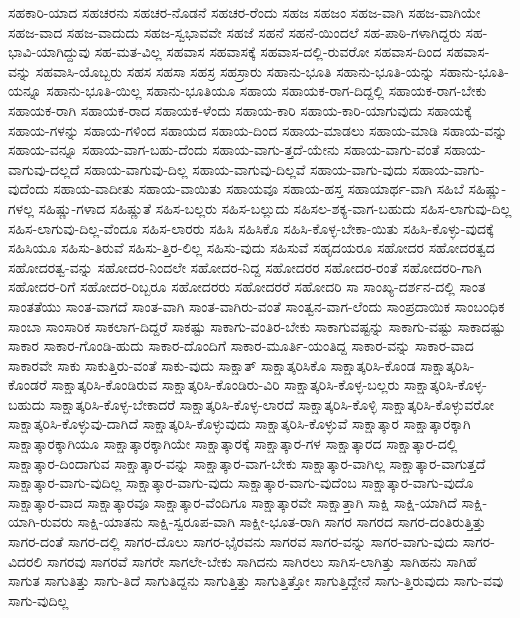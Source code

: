 {ಸಹಕಾರಿ-ಯಾದ
ಸಹಚರನು
ಸಹಚರ-ನೊಡನೆ
ಸಹಚರ-ರೆಂದು
ಸಹಜ
ಸಹಜಂ
ಸಹಜ-ವಾಗಿ
ಸಹಜ-ವಾಗಿಯೇ
ಸಹಜ-ವಾದ
ಸಹಜ-ವಾದುದು
ಸಹಜ-ಸ್ವಭಾವವೇ
ಸಹಜೆ
ಸಹನೆ
ಸಹನೆ-ಯಿಂದಲೆ
ಸಹ-ಪಾಠಿ-ಗಳಾಗಿದ್ದರು
ಸಹ-ಭಾವಿ-ಯಾಗಿದ್ದುವು
ಸಹ-ಮತ-ವಿಲ್ಲ
ಸಹವಾಸ
ಸಹವಾಸಕ್ಕೆ
ಸಹವಾಸ-ದಲ್ಲಿ-ರುವರೋ
ಸಹವಾಸ-ದಿಂದ
ಸಹವಾಸ-ವನ್ನು
ಸಹವಾಸಿ-ಯೊಬ್ಬರು
ಸಹಸ
ಸಹಸಾ
ಸಹಸ್ರ
ಸಹಸ್ರಾರು
ಸಹಾನು-ಭೂತಿ
ಸಹಾನು-ಭೂತಿ-ಯನ್ನು
ಸಹಾನು-ಭೂತಿ-ಯನ್ನೂ
ಸಹಾನು-ಭೂತಿ-ಯಿಲ್ಲ
ಸಹಾನು-ಭೂತಿಯೂ
ಸಹಾಯ
ಸಹಾಯಕ-ರಾಗ-ದಿದ್ದಲ್ಲಿ
ಸಹಾಯಕ-ರಾಗ-ಬೇಕು
ಸಹಾಯಕ-ರಾಗಿ
ಸಹಾಯಕ-ರಾದ
ಸಹಾಯಕ-ಳೆಂದು
ಸಹಾಯ-ಕಾರಿ
ಸಹಾಯ-ಕಾರಿ-ಯಾಗುವುದು
ಸಹಾಯಕ್ಕೆ
ಸಹಾಯ-ಗಳನ್ನು
ಸಹಾಯ-ಗಳಿಂದ
ಸಹಾಯದ
ಸಹಾಯ-ದಿಂದ
ಸಹಾಯ-ಮಾಡಲು
ಸಹಾಯ-ಮಾಡಿ
ಸಹಾಯ-ವನ್ನು
ಸಹಾಯ-ವನ್ನೂ
ಸಹಾಯ-ವಾಗ-ಬಹು-ದೆಂದು
ಸಹಾಯ-ವಾಗು-ತ್ತದೆ-ಯೇನು
ಸಹಾಯ-ವಾಗು-ವಂತೆ
ಸಹಾಯ-ವಾಗುವು-ದಲ್ಲದೆ
ಸಹಾಯ-ವಾಗುವು-ದಿಲ್ಲ
ಸಹಾಯ-ವಾಗುವು-ದಿಲ್ಲವೆ
ಸಹಾಯ-ವಾಗು-ವುದು
ಸಹಾಯ-ವಾಗು-ವುದೆಂದು
ಸಹಾಯ-ವಾದೀತು
ಸಹಾಯ-ವಾಯಿತು
ಸಹಾಯವೂ
ಸಹಾಯ-ಹಸ್ತ
ಸಹಾಯಾರ್ಥ-ವಾಗಿ
ಸಹಿಬೆ
ಸಹಿಷ್ಣು-ಗಳಲ್ಲ
ಸಹಿಷ್ಣು-ಗಳಾದ
ಸಹಿಷ್ಣುತೆ
ಸಹಿಸ-ಬಲ್ಲರು
ಸಹಿಸ-ಬಲ್ಲುದು
ಸಹಿಸಲ-ಶಕ್ಯ-ವಾಗ-ಬಹುದು
ಸಹಿಸ-ಲಾಗುವು-ದಿಲ್ಲ
ಸಹಿಸ-ಲಾಗುವು-ದಿಲ್ಲ-ವೆಂದೂ
ಸಹಿಸ-ಲಾರರು
ಸಹಿಸಿ
ಸಹಿಸಿಕೊ
ಸಹಿಸಿ-ಕೊಳ್ಳ-ಬೇಕಾ-ಯಿತು
ಸಹಿಸಿ-ಕೊಳ್ಳು-ವುದಕ್ಕೆ
ಸಹಿಸಿಯೂ
ಸಹಿಸು-ತಿರುವೆ
ಸಹಿಸು-ತ್ತಿರ-ಲಿಲ್ಲ
ಸಹಿಸು-ವುದು
ಸಹಿಸುವೆ
ಸಹೃದಯರೂ
ಸಹೋದರ
ಸಹೋದರತ್ವದ
ಸಹೋದರತ್ವ-ವನ್ನು
ಸಹೋದರ-ನಿಂದಲೇ
ಸಹೋದರ-ನಿದ್ದ
ಸಹೋದರರ
ಸಹೋದರ-ರಂತೆ
ಸಹೋದರರಿ-ಗಾಗಿ
ಸಹೋದರ-ರಿಗೆ
ಸಹೋದರ-ರಿಬ್ಬರೂ
ಸಹೋದರರು
ಸಹೋದರರೆ
ಸಹೋದರಿ
ಸಾ
ಸಾಂಖ್ಯ-ದರ್ಶನ-ದಲ್ಲಿ
ಸಾಂತ
ಸಾಂತತೆಯು
ಸಾಂತ-ವಾಗದೆ
ಸಾಂತ-ವಾಗಿ
ಸಾಂತ-ವಾಗಿರು-ವಂತೆ
ಸಾಂತ್ವನ-ವಾಗ-ಲೆಂದು
ಸಾಂಪ್ರದಾಯಿಕ
ಸಾಂಬಂಧಿಕ
ಸಾಂಬಾ
ಸಾಂಸಾರಿಕ
ಸಾಕಲಾಗ-ದಿದ್ದರೆ
ಸಾಕಷ್ಟು
ಸಾಕಾಗು-ವಂತಿರ-ಬೇಕು
ಸಾಕಾಗುವಷ್ಟನ್ನು
ಸಾಕಾಗು-ವಷ್ಟು
ಸಾಕಾದಷ್ಟು
ಸಾಕಾರ
ಸಾಕಾರ-ಗೊಂಡಿ-ಹುದು
ಸಾಕಾರ-ದೊಂದಿಗೆ
ಸಾಕಾರ-ಮೂರ್ತಿ-ಯಂತಿದ್ದ
ಸಾಕಾರ-ವನ್ನು
ಸಾಕಾರ-ವಾದ
ಸಾಕಾರವೇ
ಸಾಕು
ಸಾಕುತ್ತಿರು-ವಂತೆ
ಸಾಕು-ವುದು
ಸಾಕ್ಷಾತ್
ಸಾಕ್ಷಾತ್ಕರಿಸಿಕೊ
ಸಾಕ್ಷಾತ್ಕರಿಸಿ-ಕೊಂಡ
ಸಾಕ್ಷಾತ್ಕರಿಸಿ-ಕೊಂಡರೆ
ಸಾಕ್ಷಾತ್ಕರಿಸಿ-ಕೊಂಡಿರುವ
ಸಾಕ್ಷಾತ್ಕರಿಸಿ-ಕೊಂಡಿರು-ವಿರಿ
ಸಾಕ್ಷಾತ್ಕರಿಸಿ-ಕೊಳ್ಳ-ಬಲ್ಲರು
ಸಾಕ್ಷಾತ್ಕರಿಸಿ-ಕೊಳ್ಳ-ಬಹುದು
ಸಾಕ್ಷಾತ್ಕರಿಸಿ-ಕೊಳ್ಳ-ಬೇಕಾದರೆ
ಸಾಕ್ಷಾತ್ಕರಿಸಿ-ಕೊಳ್ಳ-ಲಾರದೆ
ಸಾಕ್ಷಾತ್ಕರಿಸಿ-ಕೊಳ್ಳಿ
ಸಾಕ್ಷಾತ್ಕರಿಸಿ-ಕೊಳ್ಳುವರೋ
ಸಾಕ್ಷಾತ್ಕರಿಸಿ-ಕೊಳ್ಳುವು-ದಾಗಿದೆ
ಸಾಕ್ಷಾತ್ಕರಿಸಿ-ಕೊಳ್ಳುವುದು
ಸಾಕ್ಷಾತ್ಕರಿಸಿ-ಕೊಳ್ಳುವೆ
ಸಾಕ್ಷಾತ್ಕಾರ
ಸಾಕ್ಷಾತ್ಕಾರಕ್ಕಾಗಿ
ಸಾಕ್ಷಾತ್ಕಾರಕ್ಕಾಗಿಯೂ
ಸಾಕ್ಷಾತ್ಕಾರಕ್ಕಾಗಿಯೇ
ಸಾಕ್ಷಾತ್ಕಾರಕ್ಕೆ
ಸಾಕ್ಷಾತ್ಕಾರ-ಗಳ
ಸಾಕ್ಷಾತ್ಕಾರದ
ಸಾಕ್ಷಾತ್ಕಾರ-ದಲ್ಲಿ
ಸಾಕ್ಷಾತ್ಕಾರ-ದಿಂದಾಗುವ
ಸಾಕ್ಷಾತ್ಕಾರ-ವನ್ನು
ಸಾಕ್ಷಾತ್ಕಾರ-ವಾಗ-ಬೇಕು
ಸಾಕ್ಷಾತ್ಕಾರ-ವಾಗಿಲ್ಲ
ಸಾಕ್ಷಾತ್ಕಾರ-ವಾಗುತ್ತದೆ
ಸಾಕ್ಷಾತ್ಕಾರ-ವಾಗು-ವುದಿಲ್ಲ
ಸಾಕ್ಷಾತ್ಕಾರ-ವಾಗು-ವುದು
ಸಾಕ್ಷಾತ್ಕಾರ-ವಾಗು-ವುದೆಂಬ
ಸಾಕ್ಷಾತ್ಕಾರ-ವಾಗು-ವುದೊ
ಸಾಕ್ಷಾತ್ಕಾರ-ವಾದ
ಸಾಕ್ಷಾತ್ಕಾರವೂ
ಸಾಕ್ಷಾತ್ಕಾರ-ವೆಂದಿಗೂ
ಸಾಕ್ಷಾತ್ಕಾರವೇ
ಸಾಕ್ಷಾತ್ತಾಗಿ
ಸಾಕ್ಷಿ
ಸಾಕ್ಷಿ-ಯಾಗಿದೆ
ಸಾಕ್ಷಿ-ಯಾಗಿ-ರುವರು
ಸಾಕ್ಷಿ-ಯಾತನು
ಸಾಕ್ಷಿ-ಸ್ವರೂಪ-ವಾಗಿ
ಸಾಕ್ಷೀ-ಭೂತ-ರಾಗಿ
ಸಾಗರ
ಸಾಗರದ
ಸಾಗರ-ದಂತಿರುತ್ತಿತ್ತು
ಸಾಗರ-ದಂತೆ
ಸಾಗರ-ದಲ್ಲಿ
ಸಾಗರ-ದೊಲು
ಸಾಗರ-ಭೈರವನು
ಸಾಗರವ
ಸಾಗರ-ವನ್ನು
ಸಾಗರ-ವಾಗು-ವುದು
ಸಾಗರ-ವಿದರಲಿ
ಸಾಗರವು
ಸಾಗರವೆ
ಸಾಗರೇ
ಸಾಗಲೇ-ಬೇಕು
ಸಾಗಿದನು
ಸಾಗಿರಲು
ಸಾಗಿಸ-ಲಾಗಿತ್ತು
ಸಾಗಿಹನು
ಸಾಗಿಹೆ
ಸಾಗುತ
ಸಾಗುತಿತ್ತು
ಸಾಗು-ತಿದೆ
ಸಾಗುತಿದ್ದನು
ಸಾಗುತ್ತಿತ್ತು
ಸಾಗುತ್ತಿತ್ತೋ
ಸಾಗುತ್ತಿದ್ದೇನೆ
ಸಾಗು-ತ್ತಿರುವುದು
ಸಾಗು-ವವು
ಸಾಗು-ವುದಿಲ್ಲ
}
